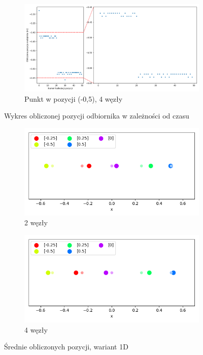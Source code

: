\begin{figure}[H]
    \ContinuedFloat\centering
    \begin{subfigure}{\textwidth}
        \centering
        \includegraphics[width=\linewidth]{pics/mult_lat_1d/position_[-0.5]_4.png}
        \caption{Punkt w pozycji  (-0,5), 4 węzły}
        \label{pic:1d_mult_[-0.5]_4}
    \end{subfigure}
    \caption{Wykres obliczonej pozycji odbiornika w zależności od czasu}
    \label{fig:1d_mult_separate}
\end{figure}

\begin{figure}[H]
    \centering
    \begin{subfigure}{.5\textwidth}
        \centering
        \includegraphics[width=\linewidth]{pics/mult_lat_1d/positions_2_mean.png}
        \caption{2 węzły}
        \label{pic:1d_2_mult}
    \end{subfigure}%
    \begin{subfigure}{.5\textwidth}
        \centering
        \includegraphics[width=\linewidth]{pics/mult_lat_1d/positions_4_mean.png}
        \caption{4 węzły}
        \label{pic:1d_4_mult}
    \end{subfigure}
    \caption{Średnie obliczonych pozycji, wariant 1D}
    \label{fig:1d_mult}
\end{figure}

